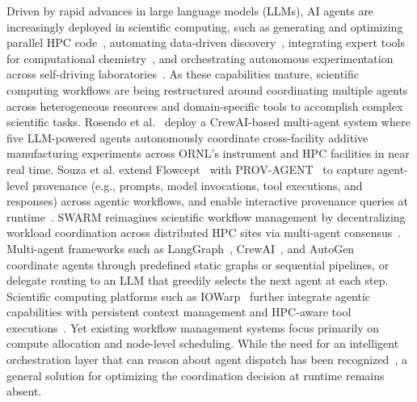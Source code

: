 \documentclass[conference,10pt]{IEEEtran}
\begin{document}
Driven by rapid advances in large language models (LLMs), AI agents are increasingly deployed in scientific computing, such as generating and optimizing parallel HPC code~\cite{hayashi2025vibecodehpc,karanjai2025hpcagenttester}, automating data-driven discovery~\cite{majumder2024datadrivendiscovery}, integrating expert tools for computational chemistry~\cite{bran2024chemcrow}, and orchestrating autonomous experimentation across self-driving laboratories~\cite{hartung2025scaince}.
As these capabilities mature, scientific computing workflows are being restructured around coordinating multiple agents across heterogeneous resources and domain-specific tools to accomplish complex scientific tasks.
Rosendo et al.~\cite{rosendo2025ai} deploy a CrewAI-based multi-agent system where five LLM-powered agents autonomously coordinate cross-facility additive manufacturing experiments across ORNL's instrument and HPC facilities in near real time. 
Souza et al. extend Flowcept~\cite{souza2023towards} with PROV-AGENT~\cite{souza2025prov} to capture agent-level provenance (e.g., prompts, model invocations, tool executions, and responses) across agentic workflows, and enable interactive provenance queries at runtime~\cite{souza2025provenance}. SWARM reimagines scientific workflow management by decentralizing workload coordination across distributed HPC sites via multi-agent consensus~\cite{balaprakash2025swarm}. 
Multi-agent frameworks such as LangGraph~\cite{langgraph2024}, CrewAI~\cite{crewai2024}, and AutoGen~\cite{wu2023autogen} coordinate agents through predefined static graphs or sequential pipelines, or delegate routing to an LLM that greedily selects the next agent at each step.
Scientific computing platforms such as IOWarp~\cite{iowarp} further integrate agentic capabilities with persistent context management and HPC-aware tool executions~\cite{}. 
Yet existing workflow management systems focus primarily on compute allocation and node-level scheduling. While the need for an intelligent orchestration layer that can reason about agent dispatch has been recognized~\cite{shin2025revolution}, a general solution for optimizing the coordination decision at runtime remains absent.
\end{document}
